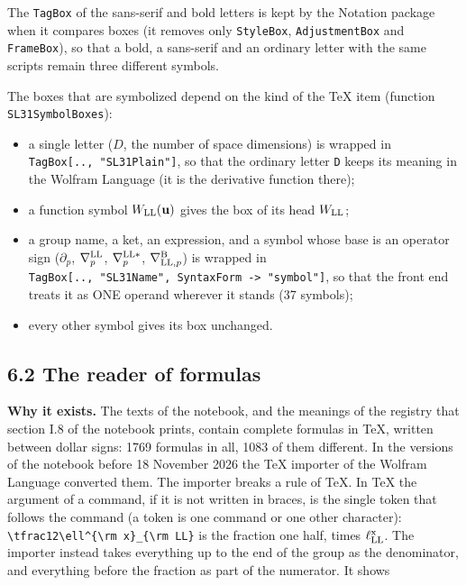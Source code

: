 \documentclass[
  10pt,
]{article}
\providecommand{\tightlist}{%
  \setlength{\itemsep}{0pt}\setlength{\parskip}{0pt}}
\begin{document}
The \texttt{TagBox} of the sans-serif and bold letters is kept by the
Notation package when it compares boxes (it removes only
\texttt{StyleBox}, \texttt{AdjustmentBox} and \texttt{FrameBox}), so
that a bold, a sans-serif and an ordinary letter with the same scripts
remain three different symbols.

The boxes that are symbolized depend on the kind of the TeX item
(function \texttt{SL31SymbolBoxes}):

\begin{itemize}
\tightlist
\item
  a single letter (\(D\), the number of space dimensions) is wrapped in
  \texttt{TagBox{[}..,\ "SL31Plain"{]}}, so that the ordinary letter
  \texttt{D} keeps its meaning in the Wolfram Language (it is the
  derivative function there);
\item
  a function symbol \(W_{\rm LL}(\mathbf u)\) gives the box of its head
  \(W_{\rm LL}\);
\item
  a group name, a ket, an expression, and a symbol whose base is an
  operator sign (\(\partial_p\), \(\nabla^{\rm LL}_p\),
  \(\nabla^{{\rm LL}*}_p\), \(\nabla^{\rm B}_{{\rm LL},p}\)) is wrapped
  in
  \texttt{TagBox{[}..,\ "SL31Name",\ SyntaxForm\ -\textgreater{}\ "symbol"{]}},
  so that the front end treats it as ONE operand wherever it stands (37
  symbols);
\item
  every other symbol gives its box unchanged.
\end{itemize}

\hypertarget{the-reader-of-formulas}{%
\subsection{6.2 The reader of formulas}\label{the-reader-of-formulas}}

\textbf{Why it exists.} The texts of the notebook, and the meanings of
the registry that section I.8 of the notebook prints, contain complete
formulas in TeX, written between dollar signs: 1769 formulas in all,
1083 of them different. In the versions of the notebook before 18
November 2026 the TeX importer of the Wolfram Language converted them.
The importer breaks a rule of TeX. In TeX the argument of a command, if
it is not written in braces, is the single token that follows the
command (a token is one command or one other character):
\texttt{\textbackslash{}tfrac12\textbackslash{}ell\^{}\{\textbackslash{}rm\ x\}\_\{\textbackslash{}rm\ LL\}}
is the fraction one half, times \(\ell^{\rm x}_{\rm LL}\). The importer
instead takes everything up to the end of the group as the denominator,
and everything before the fraction as part of the numerator. It shows
\end{document}
